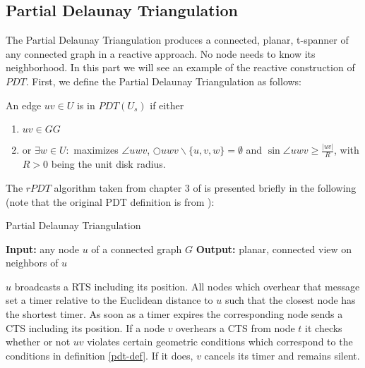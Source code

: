 \subsection{Partial Delaunay Triangulation}
\label{PDT_section}
The Partial Delaunay Triangulation produces a connected, planar, t-spanner of any connected graph in a reactive approach.
No node needs to know its neighborhood.
In this part we will see an example of the reactive construction of $PDT $.
First, we define the Partial Delaunay Triangulation as follows:
\begin{definition}
\label{pdt-def}
An edge $uv \in U $ is in $PDT(U_s) $ if either 
\begin{enumerate}
\renewcommand{\labelenumi}{(\roman{enumi})}
 \item $uv \in GG $
 \item or $\exists{w} \in U : $ maximizes $\angle{uwv} $, $\bigcirc{uwv}  \backslash \{u, v, w\} = \emptyset $ and $\sin{\angle{uwv}} \geq\frac{|uv|}{R} $, with $R>0 $ being the unit disk radius.
\end{enumerate} 
\end{definition}

The $rPDT $ algorithm taken from chapter 3 of \cite{Benter2013} is presented briefly in the following (note that the original PDT definition is from \cite{pdt}):
\algrenewcommand\algorithmicprocedure{\textbf{}}
\begin{algorithm}\small
\caption{Partial Delaunay Triangulation}\label{pdt_alg}
\begin{algorithmic}[1]
\Statex \textbf{Input:} any node $u $ of a connected graph $G $
\Statex \textbf{Output:} planar, connected view on neighbors of $u $

\Statex
\State $u $ broadcasts a RTS including its position.
\State All nodes which overhear that message set a timer relative to the Euclidean distance to $u $ such that the closest node has the shortest timer.
\State As soon as a timer expires the corresponding node sends a CTS including its position.
\State If a node $v $ overhears a CTS from node $t $ it checks whether or not $uv $ violates certain geometric conditions which correspond to the conditions in definition \ref{pdt-def}.
If it does, $v $ cancels its timer and remains silent.


\end{algorithmic}
\end{algorithm}


